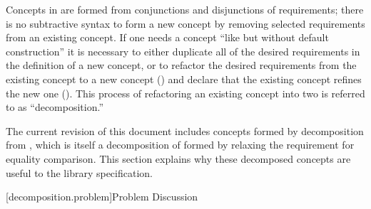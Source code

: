 
\pnum
Concepts in \Cpp are formed from conjunctions and disjunctions of requirements; there is
no subtractive syntax to form a new concept by removing selected requirements from an existing
concept. If one needs a concept ``like  but without default construction''
it is necessary to either duplicate all of the desired requirements in the definition
of a new concept, or to refactor the desired requirements from the existing concept to
a new concept () and declare that the existing concept
refines the new one (). This process of
refactoring an existing concept into two is referred to as ``decomposition.''

\pnum
The current revision of this document includes concepts formed by decomposition from
, which is itself a decomposition of  formed by relaxing the
requirement for equality comparison. This section explains why these decomposed concepts are
useful to the library specification.

[decomposition.problem]{Problem Discussion}

